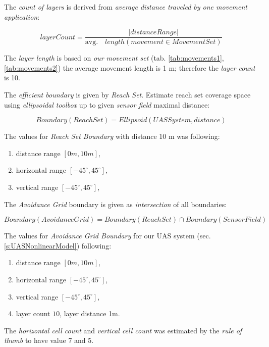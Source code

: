 \noindent The \emph{count of layers} is derived from \emph{average distance traveled by one movement application}:

\begin{equation}
    layer Count = \frac{|distance Range|}{\text{avg.}\quad length(movement\in Movement Set)}
\end{equation}

\noindent The \emph{layer length} is based on \emph{our movement set} (tab. \ref{tab:movements1}, \ref{tab:movements2}) the average movement length is 1 m; therefore the \emph{layer count} is 10.

\noindent The \emph{efficient boundary} is given by  \emph{Reach Set}. Estimate reach set coverage space using \emph{ellipsoidal toolbox} \cite{kurzhanskiy2006ellipsoidal} up to given \emph{sensor field} maximal distance:

\begin{equation}
    Boundary(Reach Set) = Ellipsoid(UAS System,distance)
\end{equation}

The values for \emph{Reach Set Boundary} with distance 10 m was following:
\begin{enumerate}
    \item distance range $[0m,10m]$,
    \item horizontal range $[-45^\circ,45^\circ]$,
    \item vertical range $[-45^\circ,45^\circ]$,
\end{enumerate}

\noindent The \emph{Avoidance Grid} boundary is given as \emph{intersection} of all boundaries:

\begin{equation}
    Boundary(Avoidance Grid) =  Boundary(Reach Set) \cap Boundary(Sensor Field)
\end{equation}

\noindent The values for \emph{Avoidance Grid Boundary} for our UAS system (sec. \ref{s:UASNonlinearModel}) following:
\begin{enumerate}
    \item distance range $[0m,10m]$,
    \item horizontal range $[-45^\circ,45^\circ]$,
    \item vertical range $[-45^\circ,45^\circ]$,
    \item layer count $10$, layer distance 1m.
\end{enumerate}

The \emph{horizontal cell count} and \emph{vertical cell count} was estimated by the  \emph{rule of thumb} to have value 7 and 5.

